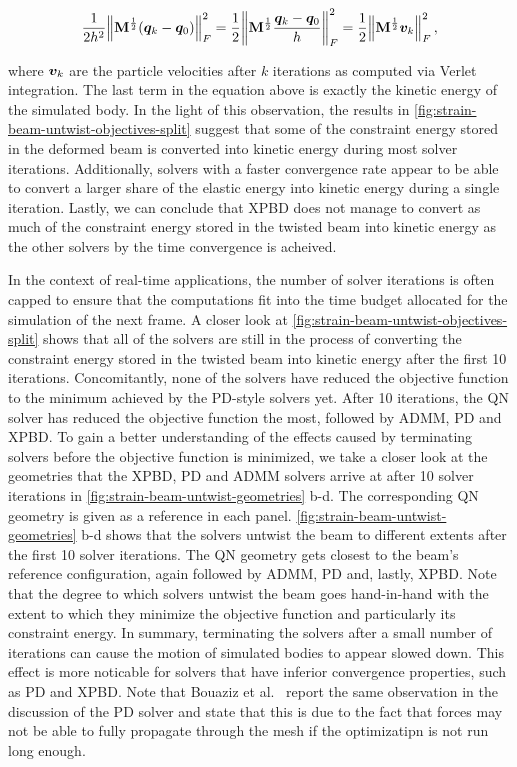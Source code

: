 \[
    \frac{1}{2h^2} \norm{\mathbf{M}^{\frac{1}{2}}(\bm{q}_k - \bm{q}_0)}^2_F 
    = \frac{1}{2} \norm{\mathbf{M}^{\frac{1}{2}}\frac{\bm{q}_k - \bm{q}_0}{h}}^2_F
    = \frac{1}{2} \norm{\mathbf{M}^{\frac{1}{2}}\bm{v}_k}^2_F,
\]

\noindent where $\bm{v}_k$ are the particle velocities after $k$ iterations as computed via Verlet integration. The last term in the equation above is exactly the 
kinetic energy of the simulated body. In the light of this observation, the results in \autoref{fig:strain-beam-untwist-objectives-split} suggest that some of the 
constraint energy stored in the deformed beam is converted into kinetic energy during most solver iterations. Additionally, solvers with a 
faster convergence rate appear to be able to convert a larger share of the elastic energy into kinetic energy during a single iteration. Lastly, we can conclude that XPBD 
does not manage to convert as much of the constraint energy stored in the twisted beam into kinetic energy as the other solvers by the time convergence is acheived.

In the context of real-time applications, the number of solver iterations is often capped to ensure that the computations fit into the time budget allocated 
for the simulation of the next frame. A closer look at \autoref{fig:strain-beam-untwist-objectives-split} shows that all of the solvers are still in the process of 
converting the constraint energy stored in the twisted beam into kinetic energy after the first 10 iterations. Concomitantly, none of the solvers have reduced the 
objective function to the minimum achieved by the PD-style solvers yet. After 10 iterations, the QN solver has reduced the objective function the most, followed by 
ADMM, PD and XPBD. To gain a better understanding of the effects caused by terminating solvers before the objective function is minimized, we take a 
closer look at the geometries that the XPBD, PD and ADMM solvers arrive at after 10 solver iterations in \autoref{fig:strain-beam-untwist-geometries} b-d. The 
corresponding QN geometry is given as a reference in each panel. \autoref{fig:strain-beam-untwist-geometries} b-d shows that the solvers untwist the beam to 
different extents after the first 10 solver iterations. The QN geometry gets closest to the beam's reference configuration, again followed by ADMM, PD and, lastly, 
XPBD. Note that the degree to which solvers untwist the beam goes hand-in-hand with the extent to which they minimize the objective function and particularly its 
constraint energy. In summary, terminating the solvers after a small number of iterations can cause the motion of simulated bodies to appear slowed down. 
This effect is more noticable for solvers that have inferior convergence properties, such as PD and XPBD. Note that Bouaziz et al.\ \cite{bouaziz2014} report 
the same observation in the discussion of the PD solver and state that this is due to the fact that forces may not be able to fully propagate through the mesh 
if the optimizatipn is not run long enough. 

